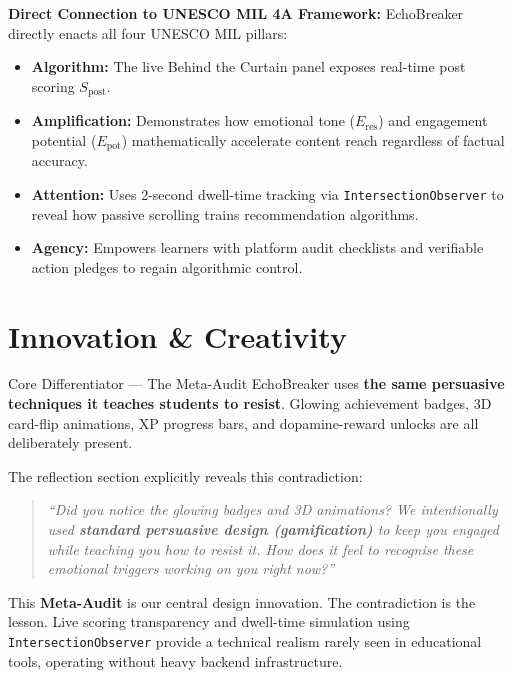 \documentclass[11pt, a4paper]{article}
\begin{document}
\textbf{Direct Connection to UNESCO MIL 4A Framework:}
EchoBreaker directly enacts all four UNESCO MIL pillars:
\begin{itemize}[noitemsep,topsep=2pt]
    \item \textbf{Algorithm:} The live Behind the Curtain panel exposes real-time post scoring $S_{\text{post}}$.
    \item \textbf{Amplification:} Demonstrates how emotional tone ($E_{\text{res}}$) and engagement potential ($E_{\text{pot}}$) mathematically accelerate content reach regardless of factual accuracy.
    \item \textbf{Attention:} Uses 2-second dwell-time tracking via \texttt{IntersectionObserver} to reveal how passive scrolling trains recommendation algorithms.
    \item \textbf{Agency:} Empowers learners with platform audit checklists and verifiable action pledges to regain algorithmic control.
\end{itemize}

\section{Innovation \& Creativity}

\begin{criteriabox}{Core Differentiator --- The Meta-Audit}
EchoBreaker uses \textbf{the same persuasive techniques it teaches students to resist}.
Glowing achievement badges, 3D card-flip animations, XP progress bars, and dopamine-reward unlocks are all deliberately present.

The reflection section explicitly reveals this contradiction:
\begin{quote}
\itshape
``Did you notice the glowing badges and 3D animations? We intentionally used \textbf{standard persuasive design (gamification)} to keep you engaged while teaching you how to resist it. How does it feel to recognise these emotional triggers working on you \emph{right now}?''
\end{quote}
\end{criteriabox}

This \textbf{Meta-Audit} is our central design innovation. The contradiction is the lesson. Live scoring transparency and dwell-time simulation using \texttt{IntersectionObserver} provide a technical realism rarely seen in educational tools, operating without heavy backend infrastructure.
\end{document}
